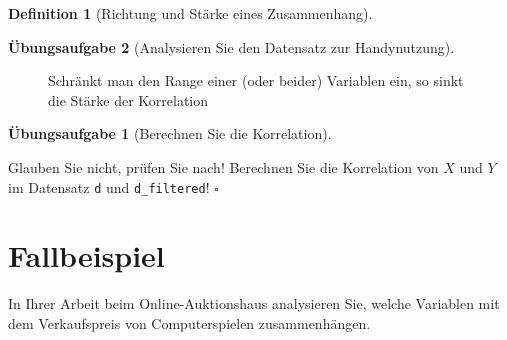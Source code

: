 \documentclass[
  a4paper,
  DIV=11]{scrreprt}
\theoremstyle{definition}
\newtheorem{exercise}{Übungsaufgabe}[chapter]
\theoremstyle{definition}
\theoremstyle{definition}
\newtheorem{definition}{Definition}[chapter]
\theoremstyle{remark}
\begin{document}
\begin{definition}[Richtung und Stärke eines
Zusammenhang]
\begin{exercise}[Analysieren Sie den Datensatz zur
Handynutzung]
\begin{figure}
\begin{minipage}{0.50\linewidth}
{}


\end{minipage}%
%
\begin{minipage}{0.50\linewidth}



\end{minipage}%

\caption{\label{fig-corr-range}Schränkt man den Range einer (oder
beider) Variablen ein, so sinkt die Stärke der Korrelation}

\end{figure}%

\begin{exercise}[Berechnen Sie die
Korrelation]\protect\hypertarget{exr-corr-range}{}\label{exr-corr-range}

Glauben Sie nicht, prüfen Sie nach! Berechnen Sie die Korrelation von
\(X\) und \(Y\) im Datensatz \texttt{d} und \texttt{d\_filtered}!
\(\square\)

\end{exercise}

\section{Fallbeispiel}\label{fallbeispiel}

In Ihrer Arbeit beim Online-Auktionshaus analysieren Sie, welche
Variablen mit dem Verkaufspreis von Computerspielen zusammenhängen.


\end{exercise}
\end{definition}
\end{document}
